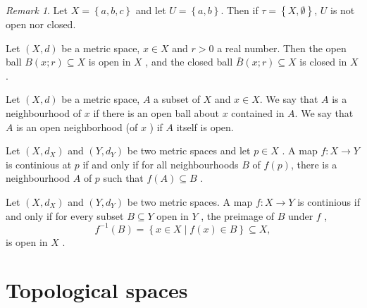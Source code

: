 \documentclass{article}
\theoremstyle{remark}
\newtheorem*{remark}{Remark}
\begin{document}
\begin{remark}
Let $X = \left\{ a,b,c \right\}$ and let $U = \left\{ a,b \right\}$. Then if $\tau = \left\{ X, \emptyset  \right\}$,
$U$ is not open nor closed.
\end{remark}

\begin{lemma}
    Let $\left( X,d \right)$ be a metric space, $x \in X$ and $r >0$ a real number. Then the open ball $B\left( x;r
    \right) \subseteq X$ is open in $X$ , and the closed ball $\overline{B}\left( x;r \right) \subseteq X$ is closed in
    $X$ .
\end{lemma}

\begin{definition}[Neightbourhoods]
    Let $\left( X,d \right)$ be a metric space, $A$ a subset of $X$ and $x \in X$. We say that $A$ is a neighbourhood of
    $x$ if there is an open ball about $x$ contained in $A$. We say that $A$ is an open neighborhood (of $x$ ) if $A$
    itself is open.
\end{definition}

\begin{theorem}
    Let $\left( X,d_{X} \right)$ and $\left( Y, d_{Y} \right)$ be two metric spaces and let $p \in X$ . A map $f: X \to
    Y$ is continious at $p$ if and only if for all neighbourhoods $B$ of $f\left( p \right)$, there is a neighbourhood
    $A$ of $p$ such that $f\left( A \right)\subseteq B$ .
\end{theorem}
\begin{theorem}
    Let $\left( X,d_{X} \right)$ and $\left( Y,d_{Y} \right)$ be two metric spaces. A map $f: X\to Y$ is continious if
    and only if for every subset $B \subseteq Y$ open in $Y$ , the preimage of $B$ under $f$ , \[
    f^{-1}\left( B \right) = \left\{ x \in X  \mid  f\left( x \right) \in B \right\} \subseteq X,
    \]
    is open in $X$ .

\end{theorem}

\section{ Topological spaces}%
\label{sec:Ch3}
\end{document}
